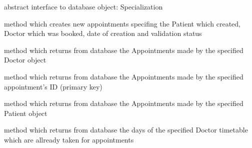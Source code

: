 \documentclass[letterpaper,10pt,english]{sphinxmanual}
\begin{document}
\begin{fulllineitems}
\label{dao:doctors.dao.AppointmentDAO}
abstract interface to database object: Specialization

\begin{fulllineitems}
\label{dao:doctors.dao.AppointmentDAO.create}
method which creates new appointments specifing the Patient which created, Doctor which was booked, date of creation and validation status

\end{fulllineitems}


\begin{fulllineitems}
\label{dao:doctors.dao.AppointmentDAO.getByDoctor}
method which returns from database the Appointments made by the specified Doctor object

\end{fulllineitems}


\begin{fulllineitems}
\label{dao:doctors.dao.AppointmentDAO.getByID}
method which returns from database the Appointments made by the specified appointment's ID (primary key)

\end{fulllineitems}


\begin{fulllineitems}
\label{dao:doctors.dao.AppointmentDAO.getByPatient}
method which returns from database the Appointments made by the specified Patient object

\end{fulllineitems}


\begin{fulllineitems}
\label{dao:doctors.dao.AppointmentDAO.getTakenDays}
method which returns from database the days of the specified Doctor timetable which are allready taken for appointments

\end{fulllineitems}


\end{fulllineitems}
\end{document}
